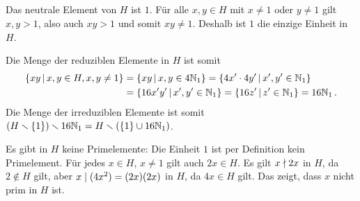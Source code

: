 \subsection{}

Das neutrale Element von $H$ ist $1$.
Für alle $x, y \in H$ mit $x \neq 1$ oder $y \neq 1$ gilt $x,y > 1$, also auch $xy > 1$ und somit $xy \neq 1$.
Deshalb ist $1$ die einzige Einheit in $H$.

Die Menge der reduziblen Elemente in $H$ ist somit
\begin{align*}
      \{ xy \suchthat x, y \in H, x, y \neq 1 \}
  &=  \{ xy \suchthat x, y \in 4 \Natural_1 \}
   =  \{ 4x' \cdot 4y' \suchthat x', y' \in \Natural_1 \} \\
  &=  \{ 16x'y' \suchthat x', y' \in \Natural_1 \}
   =  \{ 16z' \suchthat z' \in \Natural_1\}
   =  16 \Natural_1 \,.
\end{align*}
Die Menge der irreduziblen Elemente ist somit $(H \smallsetminus \{1\}) \smallsetminus 16 \mathbb{N}_1 = H \smallsetminus (\{1\} \cup 16 \mathbb{N}_1)$.

Es gibt in $H$ keine Primelemente:
Die Einheit $1$ ist per Definition kein Primelement.
Für jedes $x \in H$, $x \neq 1$ gilt auch $2x \in H$.
Es gilt $x \mathrel{\nmid} 2x$ in $H$, da $2 \notin H$ gilt, aber $x \mathrel{|} (4x^2) = (2x)(2x)$ in $H$, da $4x \in H$ gilt.
Das zeigt, dass $x$ nicht prim in $H$ ist.










